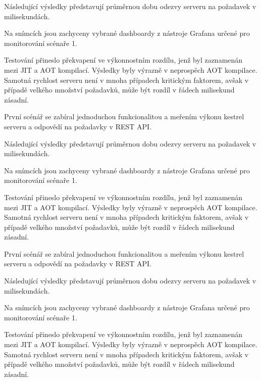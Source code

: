 Následující výsledky představují průměrnou dobu odezvy serveru na požadavek v milisekundách. 

Na snímcích jsou zachyceny vybrané dashboardy z nástroje Grafana určené pro monitorování scénaře 1. 


Testování přineslo překvapení ve výkonnostním rozdílu, jenž byl zaznamenán mezi JIT a AOT kompilací. Výsledky byly výrazně v neprospěch AOT kompilace. Samotná rychlost serveru není v mnoha případech kritickým faktorem, avšak v případě velkého množství požadavků, může být rozdíl v řádech milisekund zásadní.


První scénář se zabíral jednoduchou funkcionalitou a meřením výkonu kestrel serveru a odpovědí na požadavky v REST API.


Následující výsledky představují průměrnou dobu odezvy serveru na požadavek v milisekundách. 

Na snímcích jsou zachyceny vybrané dashboardy z nástroje Grafana určené pro monitorování scénaře 1. 


Testování přineslo překvapení ve výkonnostním rozdílu, jenž byl zaznamenán mezi JIT a AOT kompilací. Výsledky byly výrazně v neprospěch AOT kompilace. Samotná rychlost serveru není v mnoha případech kritickým faktorem, avšak v případě velkého množství požadavků, může být rozdíl v řádech milisekund zásadní.


První scénář se zabíral jednoduchou funkcionalitou a meřením výkonu kestrel serveru a odpovědí na požadavky v REST API.


Následující výsledky představují průměrnou dobu odezvy serveru na požadavek v milisekundách. 

Na snímcích jsou zachyceny vybrané dashboardy z nástroje Grafana určené pro monitorování scénaře 1. 


Testování přineslo překvapení ve výkonnostním rozdílu, jenž byl zaznamenán mezi JIT a AOT kompilací. Výsledky byly výrazně v neprospěch AOT kompilace. Samotná rychlost serveru není v mnoha případech kritickým faktorem, avšak v případě velkého množství požadavků, může být rozdíl v řádech milisekund zásadní.
